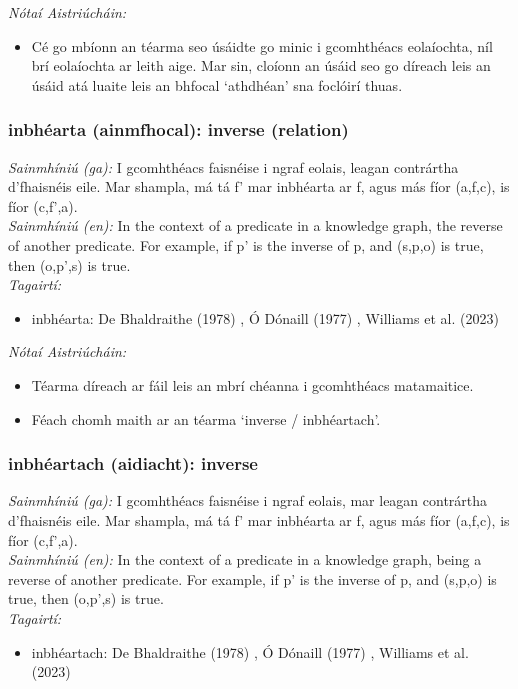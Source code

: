  \noindent \textit{Nótaí Aistriúcháin:}
\begin{itemize}
	\item Cé go mbíonn an téarma seo úsáidte go minic i gcomhthéacs eolaíochta, níl brí eolaíochta ar leith aige. Mar sin, cloíonn an úsáid seo go díreach leis an úsáid atá luaite leis an bhfocal `athdhéan' sna foclóirí thuas.
\end{itemize}


\subsubsection*{inbhéarta (ainmfhocal): inverse (relation)}
 \noindent \textit{Sainmhíniú (ga):} I gcomhthéacs faisnéise i ngraf eolais, leagan contrártha d'fhaisnéis eile. Mar shampla, má tá f' mar inbhéarta ar f, agus más fíor (a,f,c), is fíor (c,f',a).
\\
 \noindent \textit{Sainmhíniú (en):} In the context of a predicate in a knowledge graph, the reverse of another predicate. For example, if p' is the inverse of p, and (s,p,o) is true, then (o,p',s) is true.
\\
 \noindent \textit{Tagairtí:}
\begin{itemize}
	\item inbhéarta: De Bhaldraithe (1978) \cite{de-bhaldraithe}, Ó Dónaill (1977) \cite{odonaill}, Williams et al. (2023) \cite{storchiste}
\end{itemize}

 \noindent \textit{Nótaí Aistriúcháin:}
\begin{itemize}
	\item Téarma díreach ar fáil leis an mbrí chéanna i gcomhthéacs matamaitice.
	\item Féach chomh maith ar an téarma `inverse / inbhéartach'.
\end{itemize}


\subsubsection*{inbhéartach (aidiacht): inverse}
 \noindent \textit{Sainmhíniú (ga):} I gcomhthéacs faisnéise i ngraf eolais, mar leagan contrártha d'fhaisnéis eile. Mar shampla, má tá f' mar inbhéarta ar f, agus más fíor (a,f,c), is fíor (c,f',a).
\\
 \noindent \textit{Sainmhíniú (en):} In the context of a predicate in a knowledge graph, being a reverse of another predicate. For example, if p' is the inverse of p, and (s,p,o) is true, then (o,p',s) is true.
\\
 \noindent \textit{Tagairtí:}
\begin{itemize}
	\item inbhéartach: De Bhaldraithe (1978) \cite{de-bhaldraithe}, Ó Dónaill (1977) \cite{odonaill}, Williams et al. (2023) \cite{storchiste}
\end{itemize}

